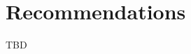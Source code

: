 \documentclass[../main.tex]{subfiles}
\begin{document}
\section{Recommendations}
TBD
\end{document}
